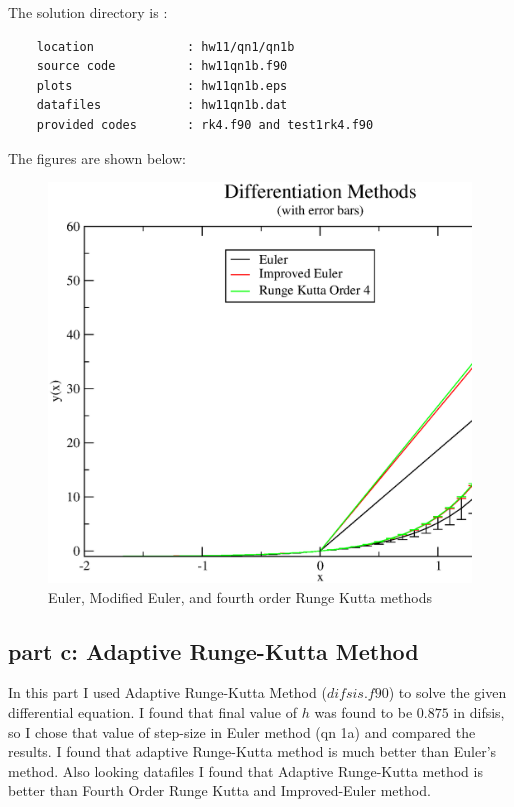 \documentclass[11pt,a4paper,english]{article}
\begin{document}
			The solution directory is :\\
	\begin{verbatim}
	location             : hw11/qn1/qn1b
	source code          : hw11qn1b.f90 
	plots                : hw11qn1b.eps
	datafiles            : hw11qn1b.dat
	provided codes       : rk4.f90 and test1rk4.f90 
	\end{verbatim}
			    The figures are shown below:\\
	\begin{figure}[h!]
	\centering
	\includegraphics [scale=0.5]{figures/hw11qn1b.eps}
	\caption{Euler, Modified Euler, and fourth order Runge Kutta methods }
	\end{figure}
	\clearpage
	
	\subsection{part c: Adaptive Runge-Kutta Method}	
	In this part I used Adaptive Runge-Kutta Method ($difsis.f90$) to solve
	the given differential equation. I found that final value of $h$ was found to
	be $0.875$ in difsis, so I chose that value of step-size in Euler method (qn 1a)
	and compared the results. I found that adaptive Runge-Kutta method is much better
	than Euler's method. Also looking datafiles I found that Adaptive Runge-Kutta method
	is better than Fourth Order Runge Kutta and Improved-Euler method.
	
\end{document}
